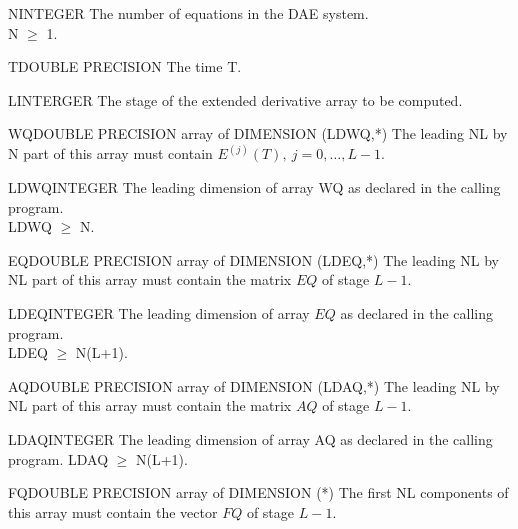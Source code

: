 \begin{entry}{N}{INTEGER}
  The number of equations in the DAE system. \\
  N $\ge$ 1.
\end{entry}

\begin{entry}{T}{DOUBLE PRECISION}
  The time T.
\end{entry}

\begin{entry}{L}{INTERGER}
  The stage of the extended derivative array to be computed.
\end{entry}

\begin{entry}{WQ}{DOUBLE PRECISION array of DIMENSION (LDWQ,*)}
  The leading NL by N part of this array must contain
  $E^{(j)}(T),\ j=0,\dots,L-1$.
\end{entry}

\begin{entry}{LDWQ}{INTEGER}
  The leading dimension of array WQ as declared in the calling
  program.\\
  LDWQ $\ge$ N.
\end{entry}

\begin{entry}{EQ}{DOUBLE PRECISION array of DIMENSION (LDEQ,*)}
  The leading NL by NL part of this array must contain the
  matrix $EQ$ of stage $L-1$.
\end{entry}

\begin{entry}{LDEQ}{INTEGER}
  The leading dimension of array $EQ$ as declared in the calling
  program.\\
  LDEQ $\ge$ N(L+1).
\end{entry}

\begin{entry}{AQ}{DOUBLE PRECISION array of DIMENSION (LDAQ,*)}
  The leading NL by NL part of this array must contain the
  matrix $AQ$ of stage $L-1$.
\end{entry}

\begin{entry}{LDAQ}{INTEGER}
  The leading dimension of array AQ as declared in the calling
  program.
  LDAQ $\ge$ N(L+1).
\end{entry}

\begin{entry}{FQ}{DOUBLE PRECISION array of DIMENSION (*)}
  The first NL components of this array must contain the vector
  $FQ$ of stage $L-1$.
\end{entry}


